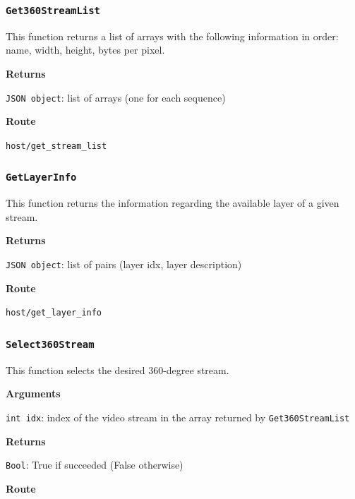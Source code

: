 \documentclass{article}
\begin{document}

\subsubsection*{\texttt{Get360StreamList}}

This function returns a list of arrays with the following information in order: name, width, height, bytes per pixel.

\textbf{Returns}

\texttt{JSON object}: list of arrays (one for each sequence)

\textbf{Route}

\texttt{host/get_stream_list}


\subsubsection*{\texttt{GetLayerInfo}}

This function returns the information regarding the available layer of a given stream.

\textbf{Returns}

\texttt{JSON object}: list of pairs (layer idx, layer description)

\textbf{Route}

\texttt{host/get_layer_info}



\subsubsection*{\texttt{Select360Stream}}

This function selects the desired 360-degree stream.

\textbf{Arguments}

\texttt{int idx}: index of the video stream in the array returned by \texttt{Get360StreamList}

\textbf{Returns}

\texttt{Bool}: True if succeeded (False otherwise)

\textbf{Route}
\end{document}

